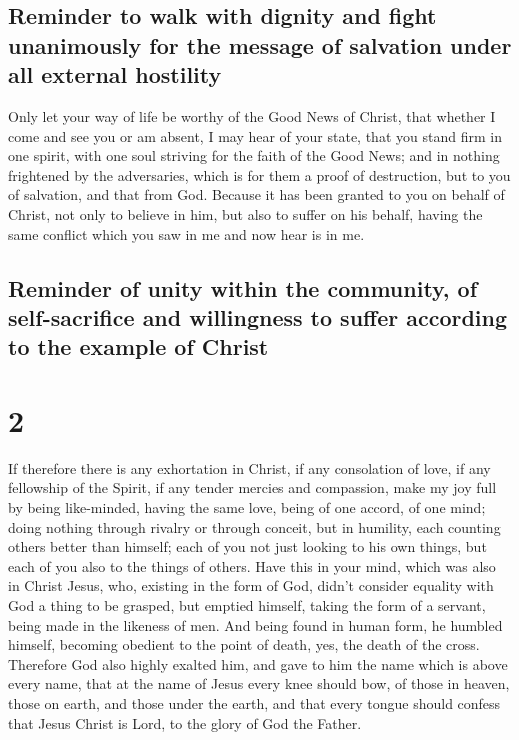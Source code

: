 \hypertarget{reminder-to-walk-with-dignity-and-fight-unanimously-for-the-message-of-salvation-under-all-external-hostility}{%
\subsection{Reminder to walk with dignity and fight unanimously for the
message of salvation under all external
hostility}\label{reminder-to-walk-with-dignity-and-fight-unanimously-for-the-message-of-salvation-under-all-external-hostility}}

 Only let your way of life be worthy of the Good News of
Christ, that whether I come and see you or am absent, I may hear of your
state, that you stand firm in one spirit, with one soul striving for the
faith of the Good News;  and in nothing frightened by the
adversaries, which is for them a proof of destruction, but to you of
salvation, and that from God.  Because it has been
granted to you on behalf of Christ, not only to believe in him, but also
to suffer on his behalf,  having the same conflict which
you saw in me and now hear is in me.

\hypertarget{reminder-of-unity-within-the-community-of-self-sacrifice-and-willingness-to-suffer-according-to-the-example-of-christ}{%
\subsection{Reminder of unity within the community, of self-sacrifice
and willingness to suffer according to the example of
Christ}\label{reminder-of-unity-within-the-community-of-self-sacrifice-and-willingness-to-suffer-according-to-the-example-of-christ}}

\hypertarget{section-1}{%
\section{2}\label{section-1}}

 If therefore there is any exhortation in Christ, if any
consolation of love, if any fellowship of the Spirit, if any tender
mercies and compassion,  make my joy full by being
like-minded, having the same love, being of one accord, of one mind;
 doing nothing through rivalry or through conceit, but in
humility, each counting others better than himself;  each
of you not just looking to his own things, but each of you also to the
things of others.  Have this in your mind, which was also
in Christ Jesus,  who, existing in the form of God, didn't
consider equality with God a thing to be grasped,  but
emptied himself, taking the form of a servant, being made in the
likeness of men.  And being found in human form, he
humbled himself, becoming obedient to the point of death, yes, the death
of the cross.  Therefore God also highly exalted him, and
gave to him the name which is above every name,  that at
the name of Jesus every knee should bow, of those in heaven, those on
earth, and those under the earth,  and that every tongue
should confess that Jesus Christ is Lord, to the glory of God the
Father.

